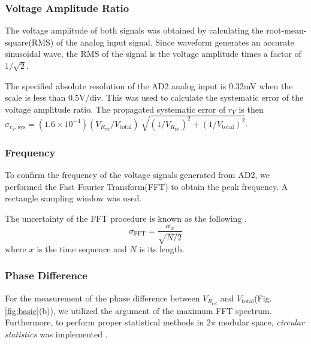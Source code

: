 \documentclass[%
 aip,
 amsmath,amssymb,
 reprint,%
]{revtex4-1}
\begin{document}
\subsubsection{Voltage Amplitude Ratio}
The voltage amplitude of both signals was obtained by calculating the root-mean-square(RMS) of the analog input signal. Since waveform generates an accurate sinusoidal wave, the RMS of the signal is the voltage amplitude times a factor of $1/\sqrt{2}$.

The specified absolute resolution of the AD2 analog input is $0.32$mV when the scale is less than $0.5$V/div\cite{ad2spec}. This was used to calculate the systematic error of the voltage amplitude ratio. The propagated systematic error of $r_{V}$ is then $\sigma_{r_{V}, \textrm{sys}}=(1.6\times10^{-4})(V_{R_{\textrm{ref}}}/V_{\textrm{total}})\>\sqrt{(1/V_{R_{\textrm{ref}}})^2 + (1/V_{\textrm{total}})^2}$.

\subsubsection{Frequency}
To confirm the frequency of the voltage signals generated from AD2, we performed the Fast Fourier Transform(FFT) to obtain the peak frequency. A rectangle sampling window was used.

The uncertainty of the FFT procedure is known as the following \cite{errorDFT}. 
\begin{equation}
    \sigma_{\textrm{FFT}} = \frac{\sigma_x}{\sqrt{N/2}}
    \label{eqn:errorDFT}
\end{equation}
where $x$ is the time sequence and $N$ is its length.

\subsubsection{Phase Difference}
For the measurement of the phase difference between $V_{R_{\textrm{ref}}}$ and $V_{\textrm{total}}$(Fig. \ref{fig:basic}(b)), we utilized the argument of the maximum FFT spectrum\cite{phaseDetection}. Furthermore, to perform proper statistical methods in $2\pi$ modular space, \textit{circular statistics} was implemented \cite{circStat}.
\end{document}
